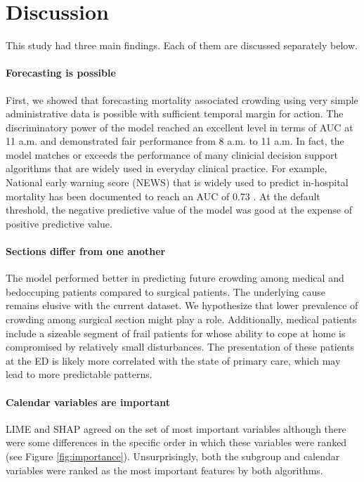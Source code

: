 \section{Discussion}\label{discussion}
This study had three main findings. Each of them are discussed separately below.

\paragraph{Forecasting is possible} First, we showed that forecasting mortality associated crowding using very simple administrative data is possible with sufficient temporal margin for action. The discriminatory power of the model reached an excellent level in terms of AUC at 11 a.m. and demonstrated fair performance from 8 a.m. to 11 a.m. In fact, the model matches or exceeds the performance of many clinicial decision support algorithms that are widely used in everyday clinical practice. For example, National early warning score (NEWS) that is widely used to predict in-hospital mortality has been documented to reach an AUC of 0.73 \cite{Eckart2019}. At the default threshold, the negative predictive value of the model was good at the expense of positive predictive value. 


\paragraph{Sections differ from one another} The model performed better in predicting future crowding among medical and bedoccuping patients compared to surgical patients. The underlying cause remains elusive with the current dataset. We hypothesize that lower prevalence of crowding among surgical section might play a role. Additionally, medical patients include a sizeable segment of frail patients for whose ability to cope at home is compromised by relatively small disturbances. The presentation of these patients at the ED is likely more correlated with the state of primary care, which may lead to more predictable patterns.

\paragraph{Calendar variables are important}

LIME and SHAP agreed on the set of most important variables although there were some differences in the specific order in which these variables were ranked (see Figure \ref{fig:importance}). Unsurprisingly, both the subgroup and calendar variables were ranked as the most important features by both algorithms.

